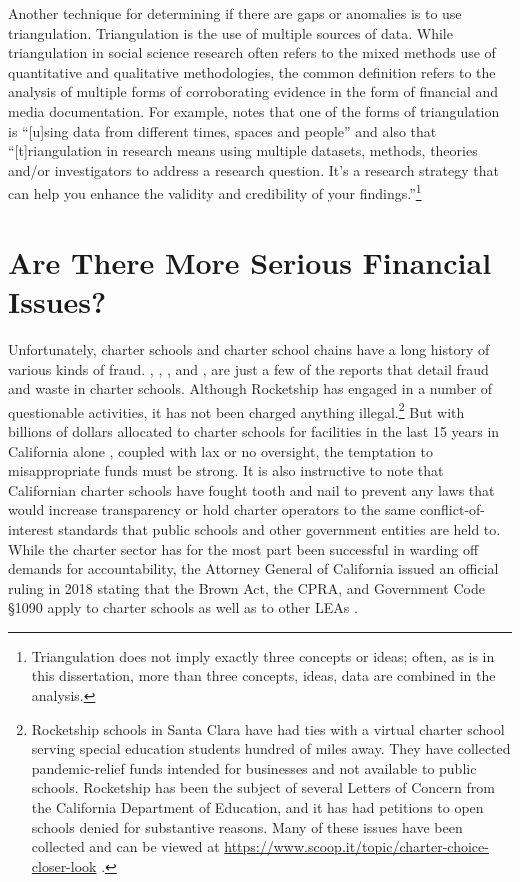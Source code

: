 Another technique for determining if there are gaps or anomalies is to use triangulation. Triangulation is the use of multiple sources of data. While triangulation in social science research often refers to the mixed methods use of quantitative and qualitative methodologies, the common definition refers to the analysis of multiple forms of corroborating evidence in the form of financial and media documentation. For example,  \textcite{Bhandari2022} notes that one of the forms of triangulation is ``[u]sing data from different times, spaces and people'' and also that ``[t]riangulation in research means using multiple datasets, methods, theories and/or investigators to address a research question. It’s a research strategy that can help you enhance the validity and credibility of your findings.''\footnote{Triangulation does not imply exactly three concepts or ideas; often, as is in this dissertation, more than three concepts, ideas, data are combined in the analysis.}


\section{Are There More Serious Financial Issues?}\label{serious-problems}\indent

Unfortunately, charter schools and charter school chains have a long history of various kinds of fraud. \textcite{Lafer2017}, \textcite{ITPT2018}, \textcite{Burris.etal2020}, and \textcite{Burris.Bryant2020}, are just a few of the reports that detail fraud and waste in charter schools. Although Rocketship has engaged in a number of questionable activities, it has not been charged anything illegal.\footnote{Rocketship schools in Santa Clara have had ties with a virtual charter school serving special education students hundred of miles away. They have collected pandemic-relief funds intended for businesses and not available to public schools. Rocketship has been the subject of several Letters of Concern from the California Department of Education, and it has had petitions to open schools denied for substantive reasons. Many of these issues have been collected and can be viewed at \url{https://www.scoop.it/topic/charter-choice-closer-look} \parencite{Marachi2022}.} But with billions of dollars allocated to charter schools for facilities in the last 15 years in California alone \parencite[4]{Lafer2017}, coupled with lax or no oversight, the temptation to misappropriate funds must be strong. It is also instructive to note that Californian charter schools have fought tooth and nail to prevent any laws that would increase transparency or hold charter operators to the same conflict-of-interest standards that public schools and other government entities are held to. While the charter sector has for the most part been successful in warding off demands for accountability, the Attorney General of California issued an official ruling in 2018 stating that the Brown Act, the CPRA, and Government Code §1090 apply to charter schools as well as to other LEAs \parencite{Becerra.Medeiros2018}.

